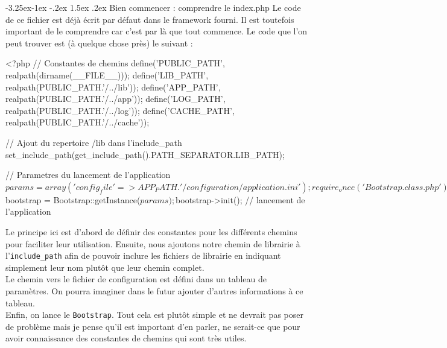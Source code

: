 \documentclass[a4paper,11pt]{article}
\makeatletter
\renewcommand{\subsection}{\@startsection{subsection}{2}{\z@}%
             {-3.25ex\@plus -1ex \@minus -.2ex}%
             {1.5ex \@plus .2ex}%
             {\color{bleuFonce}\normalfont\large\bfseries}}
\makeatother
\begin{document}
\subsection{Bien commencer : comprendre le index.php}
Le code de ce fichier est déjà écrit par défaut dans le framework fourni. Il est toutefois important de le comprendre car c'est par là que tout commence. Le code que l'on peut trouver est (à quelque chose près) le suivant :
\begin{PHP}
<?php
// Constantes de chemins
define('PUBLIC_PATH', realpath(dirname(__FILE__)));
define('LIB_PATH', realpath(PUBLIC_PATH.'/../lib'));
define('APP_PATH', realpath(PUBLIC_PATH.'/../app'));
define('LOG_PATH', realpath(PUBLIC_PATH.'/../log'));
define('CACHE_PATH', realpath(PUBLIC_PATH.'/../cache'));

// Ajout du repertoire /lib dans l'include_path
set_include_path(get_include_path().PATH_SEPARATOR.LIB_PATH);

// Parametres du lancement de l'application
$params = array(
'config_file' => APP_PATH.'/configuration/application.ini'
);

require_once('Bootstrap.class.php');

$bootstrap = Bootstrap::getInstance($params);
$bootstrap->init(); // lancement de l'application
\end{PHP}

Le principe ici est d'abord de définir des constantes pour les différents chemins pour faciliter leur utilisation. Ensuite, nous ajoutons notre chemin de librairie à l'\texttt{include\_path} afin de pouvoir inclure les fichiers de librairie en indiquant simplement leur nom plutôt que leur chemin complet.\\

Le chemin vers le fichier de configuration est défini dans un tableau de paramètres. On pourra imaginer dans le futur ajouter d'autres informations à ce tableau.\\

Enfin, on lance le \texttt{Bootstrap}. Tout cela est plutôt simple et ne devrait pas poser de problème mais je pense qu'il est important d'en parler, ne serait-ce que pour avoir connaissance des constantes de chemins qui sont très utiles.
\end{document}
